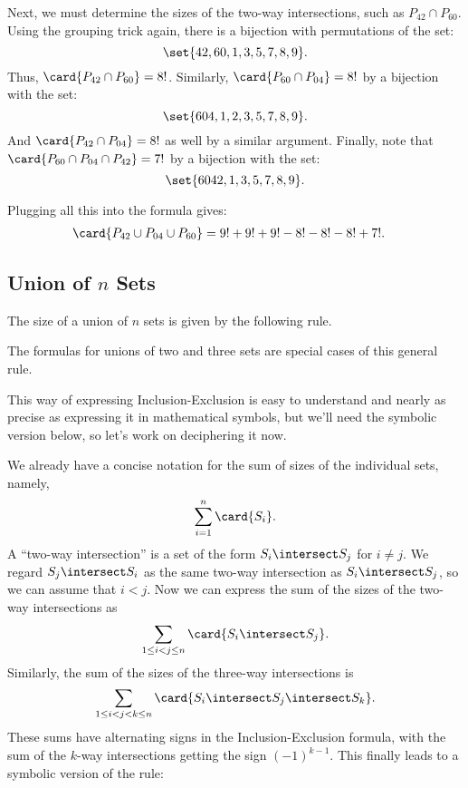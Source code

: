 Next, we must determine the sizes of the two-way intersections, such
as $P_{42} \cap P_{60}$.  Using the grouping trick again, there is a
bijection with permutations of the set:
%
\[
\set{42, 60, 1, 3, 5, 7, 8, 9}.
\]
%
Thus, $\card{P_{42} \cap P_{60}} = 8!$.  Similarly, $\card{P_{60} \cap
P_{04}} = 8!$ by a bijection with the set:
%
\[
\set{604, 1, 2, 3, 5, 7, 8, 9}.
\]
%
And $\card{P_{42} \cap P_{04}} = 8!$ as well by a similar argument.
Finally, note that $\card{P_{60} \cap P_{04} \cap P_{42}} = 7!$ by a
bijection with the set:
%
\[
\set{6042, 1, 3, 5, 7, 8, 9}.
\]

Plugging all this into the formula gives:
%
\begin{align*}
\card{P_{42} \cup P_{04} \cup P_{60}}
    & = 9! + 9! + 9! - 8! - 8! - 8! + 7!.
\end{align*}

\subsection{Union of $n$ Sets}

The size of a union of $n$ sets is given by the following rule.


The formulas for unions of two and three sets are special cases of this
general rule.

This way of expressing Inclusion-Exclusion is easy to understand and
nearly as precise as expressing it in mathematical symbols, but we'll need
the symbolic version below, so let's work on deciphering it now.

We already have a concise notation for the sum of sizes of the
individual sets, namely,
\[
\sum_{i=1}^n \card{S_i}.
\]
A ``two-way intersection'' is a set of the form $S_i \intersect S_j$ for
$i \neq j$.  We regard $S_j \intersect S_i$ as the same two-way
intersection as $S_i \intersect S_j$, so we can assume that $i < j$.  Now
we can express the sum of the sizes of the two-way intersections as
\[
\sum_{1\leq i < j \leq n} \card{S_i \intersect S_j}.
\]
Similarly, the sum of the sizes of the three-way intersections is
\[
\sum_{1\leq i < j < k \leq n} \card{S_i \intersect S_j \intersect S_k}.
\]
These sums have alternating signs in the Inclusion-Exclusion formula, with
the sum of the $k$-way intersections getting the sign $(-1)^{k-1}$.  This
finally leads to a symbolic version of the rule:

